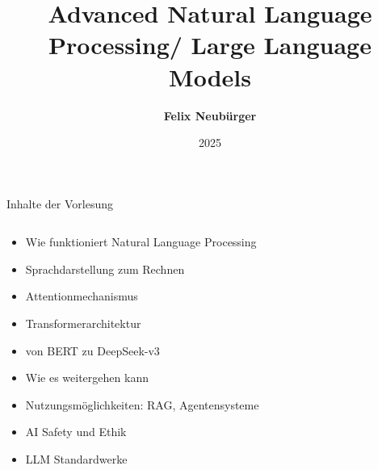 \documentclass[aspectratio=1610, xcolor=dvipsnames, 9pt]{beamer}
\title{Advanced Natural Language Processing/ Large Language Models}
\author[F.~Neubürger]{ \textbf{Felix Neubürger}}
\institute[I \& W]{Fachhochschule Südwestfalen, Ingenieurs- \& Wirtschaftswissenschaften}
\date{2025}
\begin{document}
\maketitle

\begin{frame}{Inhalte der Vorlesung}
  \begin{columns}
    \begin{column}{1\textwidth}
      \begin{itemize}
        \item Wie funktioniert Natural Language Processing\newline
        \item Sprachdarstellung zum Rechnen \newline
        \item Attentionmechanismus \newline
        \item Transformerarchitektur  \newline
        \item von BERT zu DeepSeek-v3 \newline 
        \item Wie es weitergehen kann \newline
        \item Nutzungsmöglichkeiten: RAG, Agentensysteme \newline
        \item AI Safety und Ethik \newline
        \item LLM Standardwerke 
      \end{itemize}
    \end{column}
    \begin{column}{0\textwidth}
    \end{column}
  \end{columns}
\end{frame}
\end{document}
